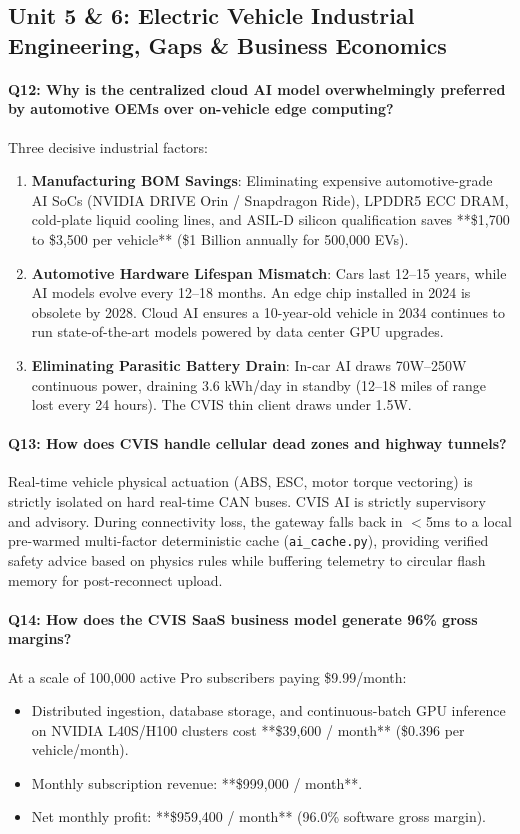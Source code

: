 \documentclass[12pt,a4paper]{report}
\begin{document}
\subsection{Unit 5 \& 6: Electric Vehicle Industrial Engineering, Gaps \& Business Economics}

\paragraph{Q12: Why is the centralized cloud AI model overwhelmingly preferred by automotive OEMs over on-vehicle edge computing?}
Three decisive industrial factors:
\begin{enumerate}[leftmargin=*,nosep]
  \item \textbf{Manufacturing BOM Savings}: Eliminating expensive automotive-grade AI SoCs (NVIDIA DRIVE Orin / Snapdragon Ride), LPDDR5 ECC DRAM, cold-plate liquid cooling lines, and ASIL-D silicon qualification saves **\$1,700 to \$3,500 per vehicle** (\$1 Billion annually for 500,000 EVs).
  \item \textbf{Automotive Hardware Lifespan Mismatch}: Cars last 12--15 years, while AI models evolve every 12--18 months. An edge chip installed in 2024 is obsolete by 2028. Cloud AI ensures a 10-year-old vehicle in 2034 continues to run state-of-the-art models powered by data center GPU upgrades.
  \item \textbf{Eliminating Parasitic Battery Drain}: In-car AI draws 70W--250W continuous power, draining 3.6 kWh/day in standby (12--18 miles of range lost every 24 hours). The CVIS thin client draws under 1.5W.
\end{enumerate}

\paragraph{Q13: How does CVIS handle cellular dead zones and highway tunnels?}
Real-time vehicle physical actuation (ABS, ESC, motor torque vectoring) is strictly isolated on hard real-time CAN buses. CVIS AI is strictly supervisory and advisory. During connectivity loss, the gateway falls back in $<$5ms to a local pre-warmed multi-factor deterministic cache (\texttt{ai\_cache.py}), providing verified safety advice based on physics rules while buffering telemetry to circular flash memory for post-reconnect upload.

\paragraph{Q14: How does the CVIS SaaS business model generate 96\% gross margins?}
At a scale of 100,000 active Pro subscribers paying \$9.99/month:
\begin{itemize}[leftmargin=*,nosep]
  \item Distributed ingestion, database storage, and continuous-batch GPU inference on NVIDIA L40S/H100 clusters cost **\$39,600 / month** (\$0.396 per vehicle/month).
  \item Monthly subscription revenue: **\$999,000 / month**.
  \item Net monthly profit: **\$959,400 / month** (96.0\% software gross margin).
\end{itemize}
\end{document}
